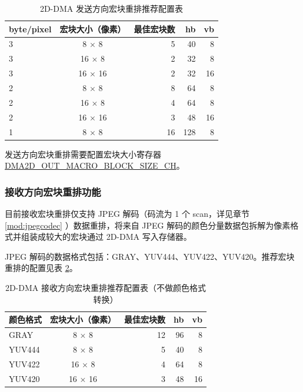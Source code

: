 \documentclass[main\_\_CN.tex]{subfiles}
\begin{document}
\begin{longtable}[c]{|l|c|r|r|r|}
\caption{2D-DMA 发送方向宏块重排推荐配置表}
\label{tab:ro_out_conf}\\
\hline
    \rowcolor{lightgray}
    \textbf {byte/pixel} & \textbf{宏块大小（像素）} & \textbf{最佳宏块数} & \textbf{hb}  & \textbf{vb} \\\hline
    3          & 8 $\times$ 8      & 5     & 40  & 8  \\ \hline
    3          & 16 $\times$ 8     & 2     & 32  & 8  \\ \hline
    3          & 16 $\times$ 16    & 2     & 32  & 16 \\ \hline
    2          & 8 $\times$ 8      & 8     & 64  & 8  \\ \hline
    2          & 16 $\times$ 8     & 4     & 64  & 8  \\ \hline
    2          & 16 $\times$ 16    & 3     & 48  & 16 \\ \hline
    1          & 8 $\times$ 8      & 16    & 128 & 8 \\ \hline
\end{longtable}


发送方向宏块重排需要配置宏块大小寄存器 \hyperref[fielddesc:DMA2DOUTMACROBLOCKSIZECHN]{DMA2D\_OUT\_MACRO\_BLOCK\_SIZE\_CH}。

\subsubsection{接收方向宏块重排功能}
目前接收宏块重排仅支持 JPEG 解码（码流为 1 个 scan，详见章节 \ref{mod:jpegcodec} \textit{}）数据重排，将来自 JPEG 解码的颜色分量数据包拆解为像素格式并组装成较大的宏块通过 2D-DMA 写入存储器。

JPEG 解码的数据格式包括：GRAY、YUV444、YUV422、YUV420。推荐宏块重排的配置见表 \ref{tab:ro_in_conf}。

\begin{longtable}[c]{|l|c|r|r|r|}
\caption{2D-DMA 接收方向宏块重排推荐配置表（不做颜色格式转换）}
\label{tab:ro_in_conf}\\
\hline
    \rowcolor{lightgray}
    \textbf{颜色格式}   & \textbf{宏块大小（像素）} & \textbf{最佳宏块数} & \textbf{hb}  & \textbf{vb} \\\hline
    GRAY   & 8 $\times$ 8      & 12    & 96  & 8  \\ \hline
    YUV444 & 8 $\times$ 8      & 5     & 40  & 8  \\ \hline
    YUV422 & 16 $\times$ 8     & 4     & 64  & 8  \\ \hline
    YUV420 & 16 $\times$ 16    & 3     & 48  & 16 \\ \hline
\end{longtable}
\end{document}
